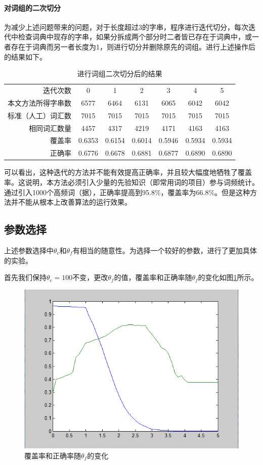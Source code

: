 \documentclass[UTF8]{ctexart}
\begin{document}
\paragraph{对词组的二次切分} 为减少上述问题带来的问题，对于长度超过3的字串，程序进行迭代切分，每次迭代中检查词典中现存的字串，如果分拆成两个部分时二者皆已存在于词典中，或一者存在于词典而另一者长度为1，则进行切分并删除原先的词组。进行上述操作后的结果如下。
\begin{table}\centering
\caption{进行词组二次切分后的结果}
\label{tab_divide_phrase}
\begin{tabular}{r|cccccc}
迭代次数 & 0 & 1 & 2 & 3 & 4 & 5 \\
本文方法所得字串数 & 6577 & 6464 & 6131 & 6065 & 6042 & 6042\\
标准（人工）词汇数 & 7015 & 7015 & 7015 & 7015 & 7015 & 7015\\
相同词汇数量 & 4457 & 4317 & 4219 & 4171 & 4163 & 4163\\
覆盖率 & 0.6353 & 0.6154 & 0.6014 & 0.5946 & 0.5934 & 0.5934\\
正确率 & 0.6776 & 0.6678 & 0.6881 & 0.6877 & 0.6890 & 0.6890\\
\end{tabular}
\end{table}

可以看出，这种迭代的方法并不能有效提高正确率，并且较大幅度地牺牲了覆盖率。这说明，本方法必须引入少量的先验知识（即常用词的项目）参与词频统计。通过引入1000个高频词（据\cite{ChangyongCibiaoCaoan}），正确率提高到95.8\%，覆盖率为66.8\%。但是这种方法并不能从根本上改善算法的运行效果。

\subsection{参数选择}
上述参数选择中$\theta_c$和$\theta_f$有相当的随意性。为选择一个较好的参数，进行了更加具体的实验。

首先我们保持$\theta_c=100$不变，更改$\theta_f$的值，覆盖率和正确率随$\theta_f$的变化如图\ref{fig_theta_f}所示。

\begin{figure}
\center
\includegraphics[width=0.8 \textwidth]{theta_f_percent.png}
\caption{覆盖率和正确率随$\theta_f$的变化}
\label{fig_theta_f}
\end{figure}
\end{document}
